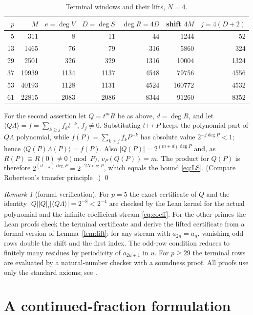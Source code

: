 \documentclass[11pt]{amsart}
\theoremstyle{definition}
\theoremstyle{remark}
\newtheorem{remark}[theorem]{Remark}
\newcommand{\abs}[1]{\left|#1\right|}
\newcommand{\frp}[1]{\langle #1\rangle}
\begin{document}
\begin{table}[ht]
\centering
\begin{tabular}{rrrrrrr}
\toprule
$p$ & $M$ & $e=\deg V$ & $D=\deg S$ & $\deg R=4D$ & shift $4M$ & $j=4(D+2)$\\
\midrule
5 & 311 & 8 & 11 & 44 & 1244 & 52\\
13 & 1465 & 76 & 79 & 316 & 5860 & 324\\
29 & 2501 & 326 & 329 & 1316 & 10004 & 1324\\
37 & 19939 & 1134 & 1137 & 4548 & 79756 & 4556\\
53 & 40193 & 1128 & 1131 & 4524 & 160772 & 4532\\
61 & 22815 & 2083 & 2086 & 8344 & 91260 & 8352\\
\bottomrule
\end{tabular}
\caption{Terminal windows and their lifts, $N=4$.}\label{tab:witnesses}
\end{table}

For the second assertion let $Q=t^mR$ be as above, $d=\deg R$, and let
$\frp{Q\Lambda}=f=\sum_{k\ge j}f_kt^{-k}$, $f_j\neq0$. Substituting $t\mapsto P$
keeps the polynomial part of $Q\Lambda$ polynomial, while
$f(P)=\sum_{k\ge j}f_kP^{-k}$ has absolute value $2^{-j\deg P}<1$; hence
$\frp{Q(P)\Lambda(P)}=f(P)$. Also $\abs{Q(P)}=2^{(m+d)\deg P}$ and, as
$R(P)\equiv R(0)\neq0\pmod P$, $v_P(Q(P))=m$. The product for $Q(P)$ is
therefore $2^{(d-j)\deg P}=2^{-2N\deg P}$, which equals the bound
\eqref{eq:LS}. (Compare Robertson's transfer principle~\cite{Rob}.)
\qed

\begin{remark}[formal verification]
For $p=5$ the exact certificate of $Q$ and the identity
$\abs{Q}\abs{Q}_t\abs{\frp{Q\Lambda}}=2^{-8}<2^{-4}$ are checked by the Lean
kernel for the actual polynomial and the infinite coefficient stream
\eqref{eq:coeff}. For the other primes the Lean proofs check the terminal
certificate and derive the lifted certificate from a formal version of
Lemma~\ref{lem:lift}: for any stream with $a_{2n}=a_n$, vanishing odd rows
double the shift and the first index. The odd-row condition reduces to finitely
many residues by periodicity of $a_{2u+1}$ in $u$. For $p\ge29$ the terminal
rows are evaluated by a natural-number checker with a soundness proof. All
proofs use only the standard axioms; see \cite{repo}.
\end{remark}

\section{A continued-fraction formulation}\label{sec:cf}
\end{document}

